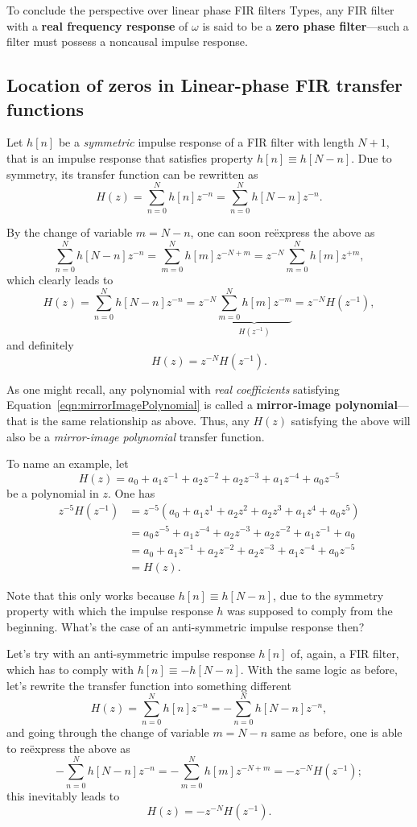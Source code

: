 \documentclass[\documentfontsize, twocolumn]{\classname}
\begin{document}
To conclude the perspective over linear phase FIR filters Types, any FIR filter with a \textbf{real frequency response} of $\omega$ is said to be a \textbf{zero phase filter}---such a filter must possess a noncausal impulse response.

\subsection{Location of zeros in Linear-phase FIR transfer functions}
Let $h[n]$ be a \emph{symmetric} impulse response of a FIR filter with length $N+1$, that is an impulse response that satisfies property $h[n] \equiv h[N-n]$. Due to symmetry, its transfer function can be rewritten as
\[
    H(z) = \sum_{n=0}^N h[n]z^{-n} = \sum_{n=0}^N h[N-n]z^{-n}.
\]

By the change of variable $m = N - n$, one can soon re\"express the above as
\[
    \sum_{n=0}^N h[N-n]z^{-n} = \sum_{m=0}^N h[m]z^{-N+m} = z^{-N}\sum_{m=0}^N h[m]z^{+m},
\]
which clearly leads to
\[
    H(z) = \sum_{n=0}^N h[N-n]z^{-n} = z^{-N}\underbrace{\sum_{m=0}^N h[m]z^{-m}}_{H(z^{-1})} = z^{-N}H(z^{-1}),
\]
and definitely
\[
    H(z) =  z^{-N}H(z^{-1}).
\]

As one might recall, any polynomial with \emph{real coefficients} satisfying Equation~\ref{eqn:mirrorImagePolynomial} is called a \textbf{mirror-image polynomial}---that is the same relationship as above. Thus, any $H(z)$ satisfying the above will also be a \emph{mirror-image polynomial} transfer function.

To name an example, let
\[
    H(z) = a_0 + a_1z^{-1} + a_2z^{-2} + a_2z^{-3} + a_1z^{-4} + a_0z^{-5}
\]
be a polynomial in $z$. One has
\begin{align*}
    z^{-5}H(z^{-1}) &= z^{-5}(a_0 + a_1z^{1} + a_2z^{2} + a_2z^{3} + a_1z^{4} + a_0z^{5}) \\
                    &= a_0z^{-5} + a_1z^{-4} + a_2z^{-3} + a_2z^{-2} + a_1z^{-1} + a_0 \\
                    &= a_0 + a_1z^{-1} + a_2z^{-2} + a_2z^{-3} + a_1z^{-4} + a_0z^{-5} \\
                    &= H(z).
\end{align*}

Note that this only works because $h[n] \equiv h[N-n]$, due to the symmetry property with which the impulse response $h$ was supposed to comply from the beginning. What's the case of an anti-symmetric impulse response then?

Let's try with an anti-symmetric impulse response $h[n]$ of, again, a FIR filter, which has to comply with $h[n] \equiv -h[N-n]$. With the same logic as before, let's rewrite the transfer function into something different
\[
    H(z) = \sum_{n=0}^N h[n]z^{-n} = -\sum_{n=0}^N h[N-n]z^{-n},
\]
and going through the change of variable $m = N - n$ same as before, one is able to re\"express the above as
\[
    -\sum_{n=0}^N h[N-n]z^{-n} = -\sum_{m=0}^N h[m] z^{-N+m} = -z^{-N}H(z^{-1});
\]
this inevitably leads to
\[
    H(z) = -z^{-N}H(z^{-1}).
\]
\end{document}
